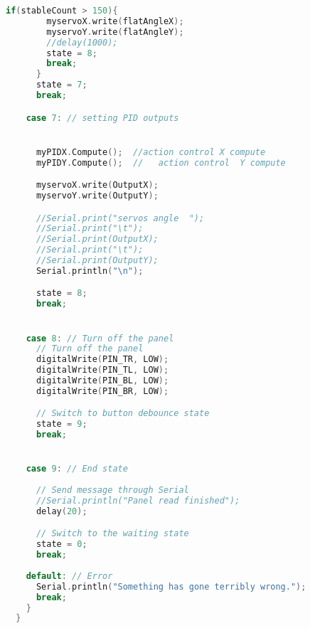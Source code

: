 \begin{lstlisting}[language=C++ , caption= Arduino  full code for controlling the system by internal PID]
      if(stableCount > 150){
        myservoX.write(flatAngleX); 
        myservoY.write(flatAngleY);
        //delay(1000);
        state = 8;
        break;
      }
      state = 7;
      break;

    case 7: // setting PID outputs


      myPIDX.Compute();  //action control X compute
      myPIDY.Compute();  //   action control  Y compute  

      myservoX.write(OutputX); 
      myservoY.write(OutputY);

      //Serial.print("servos angle  ");
      //Serial.print("\t");
      //Serial.print(OutputX);
      //Serial.print("\t");
      //Serial.print(OutputY);
      Serial.println("\n");

      state = 8;
      break;


    case 8: // Turn off the panel
      // Turn off the panel
      digitalWrite(PIN_TR, LOW);
      digitalWrite(PIN_TL, LOW);
      digitalWrite(PIN_BL, LOW);
      digitalWrite(PIN_BR, LOW);

      // Switch to button debounce state
      state = 9;
      break;


    case 9: // End state
      
      // Send message through Serial
      //Serial.println("Panel read finished");
      delay(20);

      // Switch to the waiting state
      state = 0;
      break;
      
    default: // Error
      Serial.println("Something has gone terribly wrong.");
      break;
    }
  }
\end{lstlisting}

